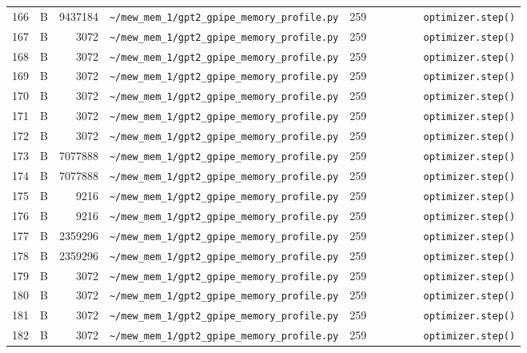 \documentclass{article}
\begin{document}
\begin{longtable}{r l r p{6.5cm} r p{7.0cm}}
166 & B & 9437184 & \lstinline|~/mew_mem_1/gpt2_gpipe_memory_profile.py| & 259 & \lstinline|        optimizer.step()| \\
167 & B & 3072 & \lstinline|~/mew_mem_1/gpt2_gpipe_memory_profile.py| & 259 & \lstinline|        optimizer.step()| \\
168 & B & 3072 & \lstinline|~/mew_mem_1/gpt2_gpipe_memory_profile.py| & 259 & \lstinline|        optimizer.step()| \\
169 & B & 3072 & \lstinline|~/mew_mem_1/gpt2_gpipe_memory_profile.py| & 259 & \lstinline|        optimizer.step()| \\
170 & B & 3072 & \lstinline|~/mew_mem_1/gpt2_gpipe_memory_profile.py| & 259 & \lstinline|        optimizer.step()| \\
171 & B & 3072 & \lstinline|~/mew_mem_1/gpt2_gpipe_memory_profile.py| & 259 & \lstinline|        optimizer.step()| \\
172 & B & 3072 & \lstinline|~/mew_mem_1/gpt2_gpipe_memory_profile.py| & 259 & \lstinline|        optimizer.step()| \\
173 & B & 7077888 & \lstinline|~/mew_mem_1/gpt2_gpipe_memory_profile.py| & 259 & \lstinline|        optimizer.step()| \\
174 & B & 7077888 & \lstinline|~/mew_mem_1/gpt2_gpipe_memory_profile.py| & 259 & \lstinline|        optimizer.step()| \\
175 & B & 9216 & \lstinline|~/mew_mem_1/gpt2_gpipe_memory_profile.py| & 259 & \lstinline|        optimizer.step()| \\
176 & B & 9216 & \lstinline|~/mew_mem_1/gpt2_gpipe_memory_profile.py| & 259 & \lstinline|        optimizer.step()| \\
177 & B & 2359296 & \lstinline|~/mew_mem_1/gpt2_gpipe_memory_profile.py| & 259 & \lstinline|        optimizer.step()| \\
178 & B & 2359296 & \lstinline|~/mew_mem_1/gpt2_gpipe_memory_profile.py| & 259 & \lstinline|        optimizer.step()| \\
179 & B & 3072 & \lstinline|~/mew_mem_1/gpt2_gpipe_memory_profile.py| & 259 & \lstinline|        optimizer.step()| \\
180 & B & 3072 & \lstinline|~/mew_mem_1/gpt2_gpipe_memory_profile.py| & 259 & \lstinline|        optimizer.step()| \\
181 & B & 3072 & \lstinline|~/mew_mem_1/gpt2_gpipe_memory_profile.py| & 259 & \lstinline|        optimizer.step()| \\
182 & B & 3072 & \lstinline|~/mew_mem_1/gpt2_gpipe_memory_profile.py| & 259 & \lstinline|        optimizer.step()| \\

\end{longtable}
\end{document}

